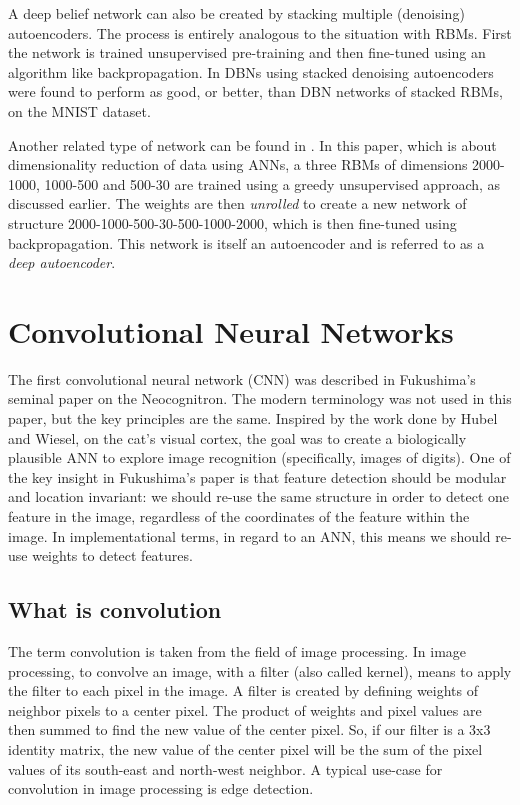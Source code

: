 \documentclass[11pt]{article}
\begin{document}
A deep belief network can also be created by stacking multiple (denoising) autoencoders.  The process is entirely analogous to the situation with RBMs.  First the network is trained unsupervised pre-training and then fine-tuned using an algorithm like backpropagation.  In \cite{bengio07} DBNs using stacked denoising autoencoders were found to perform as good, or better, than DBN networks of stacked RBMs, on the MNIST dataset.

Another related type of network can be found in \cite{hinton06reducing}.  In this paper, which is about dimensionality reduction of data using ANNs, a three RBMs of dimensions 2000-1000, 1000-500 and 500-30 are trained using a greedy unsupervised approach, as discussed earlier.  The weights are then \textit{unrolled} to create a new network of structure 2000-1000-500-30-500-1000-2000, which is then fine-tuned using backpropagation.  This network is itself an autoencoder and is referred to as a \textit{deep autoencoder}.

\section{Convolutional Neural Networks}

The first convolutional neural network (CNN) was described in Fukushima's seminal paper on the Neocognitron\cite{fukushima}.  The modern terminology was not used in this paper, but the key principles are the same.  Inspired by the work done by Hubel and Wiesel, on the cat's visual cortex\cite{hubel}, the goal was to create a biologically plausible ANN to explore image recognition (specifically, images of digits).  One of the key insight in Fukushima's paper is that feature detection should be modular and location invariant: we should re-use the same structure in order to detect one feature in the image, regardless of the coordinates of the feature within the image.  In implementational terms, in regard to an ANN, this means we should re-use weights to detect features.

\subsection{What is convolution}

The term convolution is taken from the field of image processing.  In image processing, to convolve an image, with a filter (also called kernel), means to apply the filter to each pixel in the image.  A filter is created by defining weights of neighbor pixels to a center pixel.  The product of weights and pixel values are then summed to find the new value of the center pixel.  So, if our filter is a 3x3 identity matrix, the new value of the center pixel will be the sum of the pixel values of its south-east and north-west neighbor.  A typical use-case for convolution in image processing is edge detection.
\end{document}
